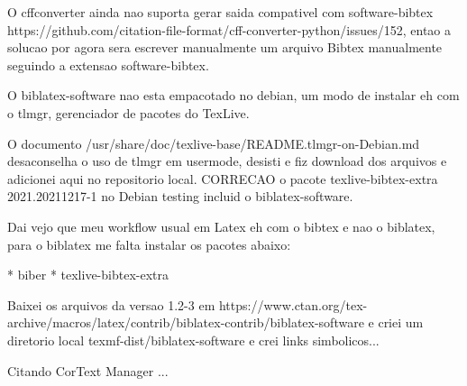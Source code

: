 \documentclass{article}
\begin{document}
O cffconverter ainda nao suporta gerar saida compativel com software-bibtex https://github.com/citation-file-format/cff-converter-python/issues/152,
entao a solucao por agora sera escrever manualmente um arquivo Bibtex manualmente seguindo a extensao software-bibtex.

O biblatex-software nao esta empacotado no debian, um modo de instalar eh com o tlmgr, gerenciador
de pacotes do TexLive.


O documento /usr/share/doc/texlive-base/README.tlmgr-on-Debian.md desaconselha o uso de tlmgr em usermode, desisti e fiz download
dos arquivos e adicionei aqui no repositorio local. CORRECAO o pacote texlive-bibtex-extra 2021.20211217-1 no Debian testing incluid o biblatex-software.

Dai vejo que meu workflow usual em Latex eh com o bibtex e nao o biblatex, para o biblatex me falta instalar os pacotes abaixo:

* biber
* texlive-bibtex-extra

Baixei os arquivos da versao 1.2-3 em https://www.ctan.org/tex-archive/macros/latex/contrib/biblatex-contrib/biblatex-software
e criei um diretorio local texmf-dist/biblatex-software e crei links simbolicos...

Citando CorText Manager \cite{cortext_manager_v2} ...

\printbibliography
\end{document}
